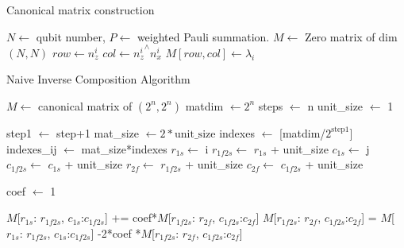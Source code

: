 \documentclass[twocolumn]{article}
\begin{document}
\begin{algorithm}
    \caption{Canonical matrix construction}\label{alg:ppoly_to_canonical}
    \begin{algorithmic}
        \Require $N \gets$ qubit number, $P \gets$ weighted Pauli summation.
        \State $M \gets$ Zero matrix of dim $(N,N)$
            \State $row \gets n_z^i$
            \State $col \gets {n_z^i}^\wedge n_x^i$
            \State $M[row, col] \gets \lambda_i$
        \EndFor
    \end{algorithmic}
\end{algorithm}


\begin{algorithm}
    \caption{Naive Inverse Composition Algorithm}\label{alg:naive_inverse}
    \begin{algorithmic}
        \Require $M \gets$ canonical matrix of $(2^n, 2^n)$
        \State matdim $\gets 2^n$
        \State steps $\gets$ n
        \State unit\_size $\gets$ 1

            \State step1 $\gets$ step+1
            \State mat\_size $\gets 2*\text{unit\_size}$
            \State indexes $\gets$ [matdim/$2^{\text{step1}}$]
            \State indexes\_ij $\gets$ mat\_size*indexes
                \State $r_{1s}\gets$ i
                \State $r_{1f2s}\gets$ $r_{1s}$ + unit\_size
                \State $c_{1s}\gets$ j
                \State $c_{1f2s}\gets$ $c_{1s}$ + unit\_size
                \State $r_{2f}\gets$ $r_{1f2s}$ + unit\_size
                \State $c_{2f}\gets$ $c_{1f2s}$ + unit\_size

                \State coef $\gets$ 1

                \State $M$[$r_{1s}$: $r_{1f2s}$, $c_{1s}$:$c_{1f2s}$] += coef*$M$[$r_{1f2s}$: $r_{2f}$, $c_{1f2s}$:$c_{2f}$]
                \State $M$[$r_{1f2s}$: $r_{2f}$, $c_{1f2s}$:$c_{2f}$] = $M$[$r_{1s}$: $r_{1f2s}$, $c_{1s}$:$c_{1f2s}$] -2*coef *$M$[$r_{1f2s}$: $r_{2f}$, $c_{1f2s}$:$c_{2f}$]


\end{algorithmic}
\end{algorithm}
\end{document}
